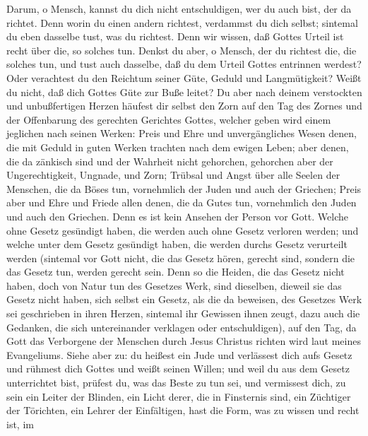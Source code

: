  Darum, o Mensch, kannst du dich nicht entschuldigen, wer du
auch bist, der da richtet. Denn worin du einen andern richtest,
verdammst du dich selbst; sintemal du eben dasselbe tust, was du
richtest.  Denn wir wissen, daß Gottes Urteil ist recht über
die, so solches tun.  Denkst du aber, o Mensch, der du
richtest die, die solches tun, und tust auch dasselbe, daß du dem Urteil
Gottes entrinnen werdest?  Oder verachtest du den Reichtum
seiner Güte, Geduld und Langmütigkeit? Weißt du nicht, daß dich Gottes
Güte zur Buße leitet?  Du aber nach deinem verstockten und
unbußfertigen Herzen häufest dir selbst den Zorn auf den Tag des Zornes
und der Offenbarung des gerechten Gerichtes Gottes,  welcher
geben wird einem jeglichen nach seinen Werken:  Preis und
Ehre und unvergängliches Wesen denen, die mit Geduld in guten Werken
trachten nach dem ewigen Leben;  aber denen, die da zänkisch
sind und der Wahrheit nicht gehorchen, gehorchen aber der
Ungerechtigkeit, Ungnade, und Zorn;  Trübsal und Angst über
alle Seelen der Menschen, die da Böses tun, vornehmlich der Juden und
auch der Griechen;  Preis aber und Ehre und Friede allen
denen, die da Gutes tun, vornehmlich den Juden und auch den Griechen.
 Denn es ist kein Ansehen der Person vor Gott.
 Welche ohne Gesetz gesündigt haben, die werden auch ohne
Gesetz verloren werden; und welche unter dem Gesetz gesündigt haben, die
werden durchs Gesetz verurteilt werden  (sintemal vor Gott
nicht, die das Gesetz hören, gerecht sind, sondern die das Gesetz tun,
werden gerecht sein.  Denn so die Heiden, die das Gesetz
nicht haben, doch von Natur tun des Gesetzes Werk, sind dieselben,
dieweil sie das Gesetz nicht haben, sich selbst ein Gesetz,
 als die da beweisen, des Gesetzes Werk sei geschrieben in
ihren Herzen, sintemal ihr Gewissen ihnen zeugt, dazu auch die Gedanken,
die sich untereinander verklagen oder entschuldigen),  auf
den Tag, da Gott das Verborgene der Menschen durch Jesus Christus
richten wird laut meines Evangeliums.  Siehe aber zu: du
heißest ein Jude und verlässest dich aufs Gesetz und rühmest dich Gottes
 und weißt seinen Willen; und weil du aus dem Gesetz
unterrichtet bist, prüfest du, was das Beste zu tun sei, 
und vermissest dich, zu sein ein Leiter der Blinden, ein Licht derer,
die in Finsternis sind,  ein Züchtiger der Törichten, ein
Lehrer der Einfältigen, hast die Form, was zu wissen und recht ist, im
